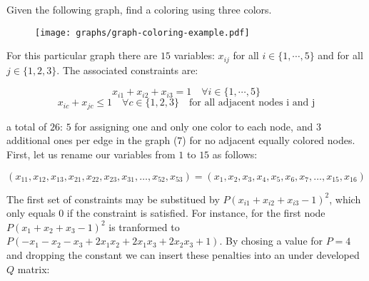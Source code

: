 

Given the following graph, find a coloring using three colors.

\begin{figure}[H]
	\texttt{[image: graphs/graph-coloring-example.pdf]}
	\centering
\end{figure}

For this particular graph there are $15$ variables: $x_{ij}$ for all $i \in \{1, \cdots, 5\}$ and for all $j \in \{1, 2, 3\}$. The associated constraints are:

$$ x_{i1} + x_{i2} + x_{i3} = 1 \quad \forall i \in \{1, \cdots, 5\} $$
$$ x_{ic} + x_{jc} \leq 1 \quad \forall c \in \{1, 2, 3\} \quad \text{for all adjacent nodes i and j} $$

a total of $26$: $5$ for assigning one and only one color to each node, and $3$ additional ones per edge in the graph ($7$) for no adjacent equally colored nodes. First, let us rename our variables from $1$ to $15$ as follows:

$$ (x_{11}, x_{12}, x_{13}, x_{21}, x_{22}, x_{23}, x_{31}, \dots, x_{52}, x_{53}) =
	(x_1, x_2, x_3, x_4, x_5, x_6, x_7, \dots, x_{15}, x_{16}) $$

The first set of constraints may be substitued by $P(x_{i1} + x_{i2} + x_{i3} - 1)^2$, which only equals $0$ if the constraint is satisfied. For instance, for the first node $P(x_1 + x_2 + x_3 - 1)^2$ is tranformed to $P(- x_1 - x_2 - x_3 + 2 x_1 x_2 + 2 x_1 x_3 + 2 x_2 x_3 + 1)$. By chosing a value for $P=4$ and dropping the constant we can  insert these penalties into an under developed $Q$ matrix:

